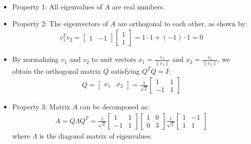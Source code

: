 \begin{frame}{}
\begin{itemize}
    \item Property 1: All eigenvalues of $A$ are real numbers.
    \item Property 2: The eigenvectors of $A$ are orthogonal to each other, as shown by:
    \begin{align}
        v_1^Tv_2 = \begin{bmatrix} 1 &  -1 \end{bmatrix} \begin{bmatrix} 1 \\ 1 \end{bmatrix} = 1 \cdot 1 + (-1) \cdot 1 = 0
    \end{align}
    \item By normalizing $v_1$ and $v_2$ to unit vectors $x_1 = \frac{v_1}{\|v_1\|}$ and $x_2 = \frac{v_2}{\|v_2\|}$, we obtain the orthogonal matrix $Q$ satisfying $Q^TQ = I$:
    \begin{align}
        Q = \begin{bmatrix}
            x_1 & x_2
        \end{bmatrix} = \frac{1}{\sqrt{2}} \begin{bmatrix}
            1 & 1 \\
            -1 & 1
        \end{bmatrix}
    \end{align}
    \item Property 3: Matrix $A$ can be decomposed as:
    \begin{align}
        A = Q \Lambda Q^T = \frac{1}{\sqrt{2}} \begin{bmatrix}
            1 & 1 \\
            -1 & 1
        \end{bmatrix} \begin{bmatrix}
            1 & 0 \\
            0 & 3
        \end{bmatrix} \frac{1}{\sqrt{2}} \begin{bmatrix}
            1 & -1 \\
            1 & 1
        \end{bmatrix}
    \end{align}
    where $\Lambda$ is the diagonal matrix of eigenvalues.
\end{itemize}
\end{frame}



